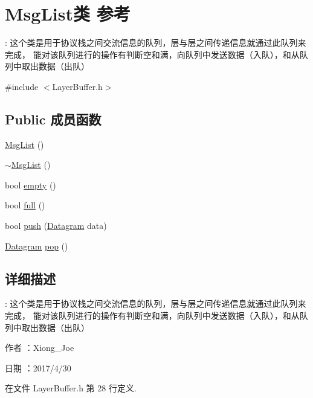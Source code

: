 \hypertarget{class_msg_list}{}\section{Msg\+List类 参考}
\label{class_msg_list}


\+: 这个类是用于协议栈之间交流信息的队列，层与层之间传递信息就通过此队列来完成， 能对该队列进行的操作有判断空和满，向队列中发送数据（入队），和从队列中取出数据（出队）  




{\ttfamily \#include $<$Layer\+Buffer.\+h$>$}

\subsection*{Public 成员函数}
\begin{DoxyCompactItemize}
\item 
\hyperlink{class_msg_list_a46c9731fd0aff048b28f4e40a2731cad}{Msg\+List} ()
\item 
\hyperlink{class_msg_list_af9729fa556cbf008c88287e7af6e9b47}{$\sim$\+Msg\+List} ()
\item 
bool \hyperlink{class_msg_list_a04cda4a2294100a9f56b7957e29ef40c}{empty} ()
\item 
bool \hyperlink{class_msg_list_abd998216b6c6566b0f06ab03806104aa}{full} ()
\item 
bool \hyperlink{class_msg_list_addbf007ab42e18737a91928e9d8efb84}{push} (\hyperlink{class_datagram}{Datagram} data)
\item 
\hyperlink{class_datagram}{Datagram} \hyperlink{class_msg_list_ac5ceb41e509380bbdb449098de3da0fb}{pop} ()
\end{DoxyCompactItemize}


\subsection{详细描述}
\+: 这个类是用于协议栈之间交流信息的队列，层与层之间传递信息就通过此队列来完成， 能对该队列进行的操作有判断空和满，向队列中发送数据（入队），和从队列中取出数据（出队） 

\begin{DoxyAuthor}{作者}
：\+Xiong\+\_\+\+Joe 
\end{DoxyAuthor}
\begin{DoxyDate}{日期}
：2017/4/30 
\end{DoxyDate}


在文件 Layer\+Buffer.\+h 第 28 行定义.



